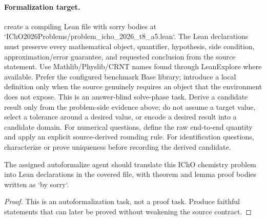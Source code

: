\paragraph{Formalization target.}
create a compiling Lean file with sorry bodies at `IChO2026Problems/problem\_icho\_2026\_t8\_a5.lean`.
The Lean declarations must preserve every mathematical object, quantifier, hypothesis, side condition, approximation/error guarantee, and requested conclusion from the source statement.
Use Mathlib/Physlib/CRNT names found through LeanExplore where available. Prefer the configured benchmark Base library; introduce a local definition only when the source genuinely requires an object that the environment does not expose.
This is an answer-blind solve-phase task. Derive a candidate result only from the problem-side evidence above; do not assume a target value, select a tolerance around a desired value, or encode a desired result into a candidate domain.
For numerical questions, define the raw end-to-end quantity and apply an explicit source-derived rounding rule. For identification questions, characterize or prove uniqueness before recording the derived candidate.

\begin{theorem}
\label{thm:physics:icho_2026_t8_a5:target}
The assigned autoformalize agent should translate this IChO chemistry problem into Lean declarations in the covered file, with theorem and lemma proof bodies written as `by sorry`.
\end{theorem}
\begin{proof}
This is an autoformalization task, not a proof task. Produce faithful statements that can later be proved without weakening the source contract.
\end{proof}
